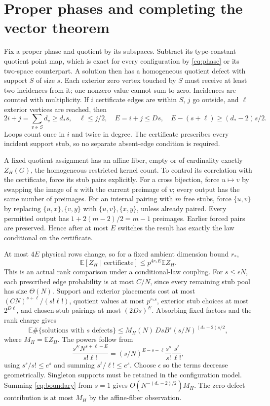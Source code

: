 \documentclass[11pt]{article}
\newcommand{\E}{\mathbb E}
\begin{document}
\section{Proper phases and completing the vector theorem}
Fix a proper phase and quotient by its subspaces. Subtract its type-constant quotient point map, which is exact for every configuration by \eqref{eq:phase} or its two-space counterpart. A solution then has a homogeneous quotient defect with support $S$ of size $s$. Each exterior zero vertex touched by $S$ must receive at least two incidences from it; one nonzero value cannot sum to zero. Incidences are counted with multiplicity. If $i$ certificate edges are within $S$, $j$ go outside, and $\ell$ exterior vertices are reached, then
\[
 2i+j=\sum_{v\in S}d_v\ge d_*s,\quad \ell\le j/2,
 \quad E=i+j\le Ds,\quad E-(s+\ell)\ge(d_*-2)s/2.
\]
Loops count once in $i$ and twice in degree. The certificate prescribes every incident support stub, so no separate absent-edge condition is required.

A fixed quotient assignment has an affine fiber, empty or of cardinality exactly $Z_H(G)$, the homogeneous restricted kernel count. To control its correlation with the certificate, force its stub pairs explicitly. For a cross bijection, force $u\mapsto v$ by swapping the image of $u$ with the current preimage of $v$; every output has the same number of preimages. For an internal pairing with $m$ free stubs, force $\{u,v\}$ by replacing $\{u,x\},\{v,y\}$ with $\{u,v\},\{x,y\}$, unless already paired. Every permitted output has $1+2(m-2)/2=m-1$ preimages. Earlier forced pairs are preserved. Hence after at most $E$ switches the result has exactly the law conditional on the certificate.

At most $4E$ physical rows change, so for a fixed ambient dimension bound $r_*$,
\[
 \E[Z_H\mid\text{certificate}]\le p^{4r_*E}\E Z_H.
\]
This is an actual rank comparison under a conditional-law coupling. For $s\le\epsilon N$, each prescribed edge probability is at most $C/N$, since every remaining stub pool has size $\Theta(N)$. Support and exterior placements cost at most $(C N)^{s+\ell}/(s!\ell!)$, quotient values at most $p^{r_*s}$, exterior stub choices at most $2^{D\ell}$, and chosen-stub pairings at most $(2Ds)^E$. Absorbing fixed factors and the rank charge gives
\begin{equation}\label{eq:boundary}
 \E\#\{\text{solutions with }s\text{ defects}\}
 \le M_H(N)\,Ds B^s(s/N)^{(d_*-2)s/2},
\end{equation}
where $M_H=\E Z_H$. The powers follow from
\[
 \frac{s^E N^{s+\ell-E}}{s!\ell!}
 =(s/N)^{E-s-\ell}\frac{s^s}{s!}\frac{s^\ell}{\ell!},
\]
using $s^s/s!\le e^s$ and summing $s^\ell/\ell!\le e^s$. Choose $\epsilon$ so the terms decrease geometrically. Singleton supports must be retained in the configuration model. Summing \eqref{eq:boundary} from $s=1$ gives $O(N^{-(d_*-2)/2})M_H$. The zero-defect contribution is at most $M_H$ by the affine-fiber observation.
\end{document}
